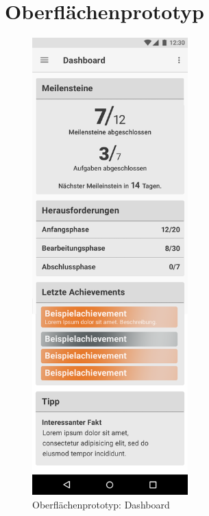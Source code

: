 \documentclass[bibliography=totoc,listof=totoc,BCOR=5mm,DIV=12,oneside]{scrbook}
\begin{document}
{\section{Oberflächenprototyp}
\label{anhang:oberflaeche}
\begin{figure}[H]
	\centering
	\includegraphics[width=6cm]{Bilder/Prototyp/photoshop_screenshots/Dashboard.png}
\caption{Oberflächenprototyp: Dashboard}
\label{img:ptototypDashboard}
\end{figure}

}
\end{document}

